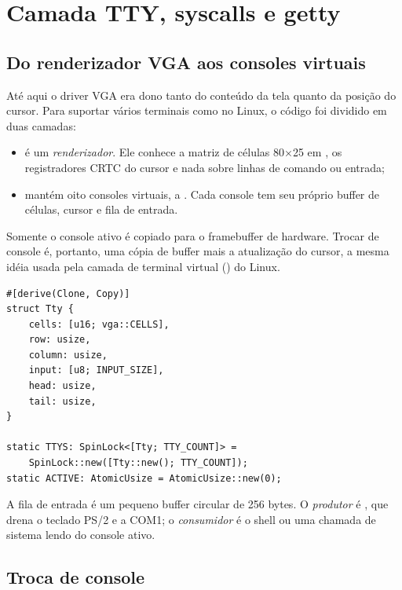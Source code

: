 \chapter{Camada TTY, syscalls e getty}
\label{cap:tty}

\section{Do renderizador VGA aos consoles virtuais}

At\'e aqui o driver VGA era dono tanto do conte\'udo da tela quanto da posi\c{c}\~ao
do cursor. Para suportar v\'arios terminais como no Linux, o c\'odigo foi
dividido em duas camadas:

\begin{itemize}
  \item {} \'e um \emph{renderizador}. Ele conhece a matriz de
        c\'elulas 80$\times$25 em , os registradores CRTC do
        cursor e nada sobre linhas de comando ou entrada;
  \item {} mant\'em oito consoles virtuais,  a
        . Cada console tem seu pr\'oprio buffer de c\'elulas,
        cursor e fila de entrada.
\end{itemize}

Somente o console ativo \'e copiado para o framebuffer de hardware. Trocar de
console \'e, portanto, uma c\'opia de buffer mais a atualiza\c{c}\~ao do cursor,
a mesma id\'eia usada pela camada de terminal virtual () do Linux.

\begin{lstlisting}[caption={Estado de cada console em \code{tty.rs}.},label={lst:ttytty}]
#[derive(Clone, Copy)]
struct Tty {
    cells: [u16; vga::CELLS],
    row: usize,
    column: usize,
    input: [u8; INPUT_SIZE],
    head: usize,
    tail: usize,
}

static TTYS: SpinLock<[Tty; TTY_COUNT]> =
    SpinLock::new([Tty::new(); TTY_COUNT]);
static ACTIVE: AtomicUsize = AtomicUsize::new(0);
\end{lstlisting}

A fila de entrada \'e um pequeno buffer circular de 256 bytes. O
\emph{produtor} \'e , que drena o teclado PS/2 e a COM1; o
\emph{consumidor} \'e o shell ou uma chamada de sistema lendo do console ativo.

\section{Troca de console}

